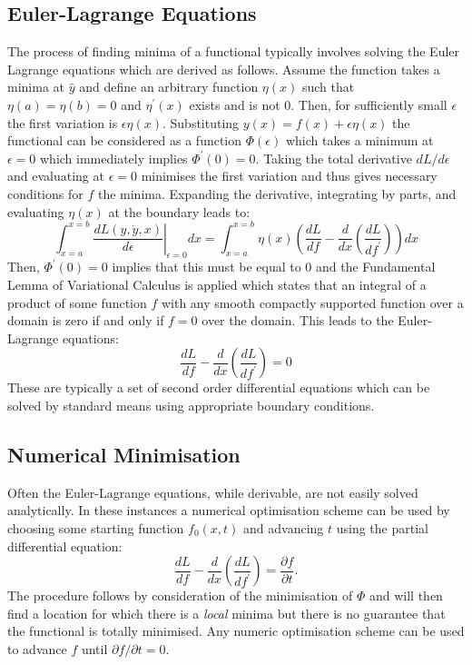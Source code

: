 \subsection{Euler-Lagrange Equations}
The process of finding minima of a functional typically involves solving the Euler Lagrange equations which are derived as follows. Assume the function takes a minima at $\hat{y}$ and define an arbitrary function $\eta(x)$ such that $\eta(a)=\eta(b)=0$ and $\eta^\prime(x)$ exists and is not 0. Then, for sufficiently small $\epsilon$ the first variation is $\epsilon\eta(x)$. Substituting $y(x) = f(x) + \epsilon \eta(x)$ the functional can be considered as a function $\Phi(\epsilon)$ which takes a minimum at $\epsilon = 0$ which immediately implies $\Phi^\prime(0) = 0$. Taking the total derivative $dL/d\epsilon$ and evaluating at $\epsilon = 0$ minimises the first variation and thus gives necessary conditions for $f$ the minima. Expanding the derivative, integrating by parts, and evaluating $\eta(x)$ at the boundary leads to:
\begin{equation}
\int_{x=a}^{x=b} \left.\frac{dL(y, \dot{y}, x)}{d\epsilon}\right\vert_{\epsilon = 0} dx = \int_{x=a}^{x=b} \eta(x)\left( \frac{dL}{df} -  \frac{d}{dx}\left(\frac{dL}{df^\prime}\right)\right)dx
\end{equation}
Then, $\Phi^\prime(0) = 0$ implies that this must be equal to 0 and the Fundamental Lemma of Variational Calculus is applied which states that an integral of a product of some function $f$ with any smooth compactly supported function over a domain is zero if and only if $f = 0$ over the domain. This leads to the Euler-Lagrange equations:
\begin{equation}
\frac{dL}{df} - \frac{d}{dx}\left(\frac{dL}{df^\prime}\right) = 0 
\end{equation}
These are typically a set of second order differential equations which can be solved by standard means using appropriate boundary conditions.
\subsection{Numerical Minimisation \label{sec:minimisation}} 
Often the Euler-Lagrange equations, while derivable, are not easily solved analytically. In these instances a numerical optimisation scheme can be used by choosing some starting function $f_0(x, t)$ and advancing $t$ using the partial differential equation:
\begin{equation}
\frac{dL}{df} - \frac{d}{dx}\left(\frac{dL}{df^\prime}\right) = \frac{\partial f}{\partial t}.
\end{equation}
The procedure follows by consideration of the minimisation of $\Phi$ and will then find a location for which there is a \textit{local} minima but there is no guarantee that the functional is totally minimised. Any numeric optimisation scheme can be used to advance $f$ until $\partial f / \partial t= 0$.
